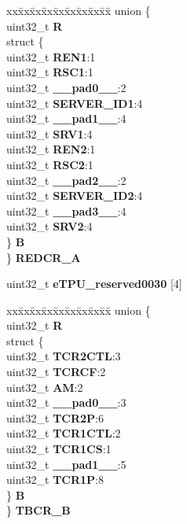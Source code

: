 \begin{DoxyCompactItemize}
\begin{tabbing}
\end{tabbing}\item 
\mbox{\label{structETPU__tag_a26d82d26cc045bb3ff84bc393ad2af09}} 
\begin{tabbing}
xx\=xx\=xx\=xx\=xx\=xx\=xx\=xx\=xx\=\kill
union \{\\
\>uint32\_t {\bfseries R}\\
\>struct \{\\
\>\>uint32\_t {\bfseries REN1}:1\\
\>\>uint32\_t {\bfseries RSC1}:1\\
\>\>uint32\_t {\bfseries \_\_pad0\_\_}:2\\
\>\>uint32\_t {\bfseries SERVER\_ID1}:4\\
\>\>uint32\_t {\bfseries \_\_pad1\_\_}:4\\
\>\>uint32\_t {\bfseries SRV1}:4\\
\>\>uint32\_t {\bfseries REN2}:1\\
\>\>uint32\_t {\bfseries RSC2}:1\\
\>\>uint32\_t {\bfseries \_\_pad2\_\_}:2\\
\>\>uint32\_t {\bfseries SERVER\_ID2}:4\\
\>\>uint32\_t {\bfseries \_\_pad3\_\_}:4\\
\>\>uint32\_t {\bfseries SRV2}:4\\
\>\} {\bfseries B}\\
\} {\bfseries REDCR\_A}\\

\end{tabbing}\item 
\mbox{\label{structETPU__tag_ac95cf2650de037033f97d9d798f5b4d9}} 
uint32\+\_\+t {\bfseries e\+T\+P\+U\+\_\+reserved0030} \mbox{[}4\mbox{]}
\item 
\mbox{\label{structETPU__tag_a566225c54d41ab5b83dc294f5992d250}} 
\begin{tabbing}
xx\=xx\=xx\=xx\=xx\=xx\=xx\=xx\=xx\=\kill
union \{\\
\>uint32\_t {\bfseries R}\\
\>struct \{\\
\>\>uint32\_t {\bfseries TCR2CTL}:3\\
\>\>uint32\_t {\bfseries TCRCF}:2\\
\>\>uint32\_t {\bfseries AM}:2\\
\>\>uint32\_t {\bfseries \_\_pad0\_\_}:3\\
\>\>uint32\_t {\bfseries TCR2P}:6\\
\>\>uint32\_t {\bfseries TCR1CTL}:2\\
\>\>uint32\_t {\bfseries TCR1CS}:1\\
\>\>uint32\_t {\bfseries \_\_pad1\_\_}:5\\
\>\>uint32\_t {\bfseries TCR1P}:8\\
\>\} {\bfseries B}\\
\} {\bfseries TBCR\_B}\\


\end{tabbing}
\end{DoxyCompactItemize}
